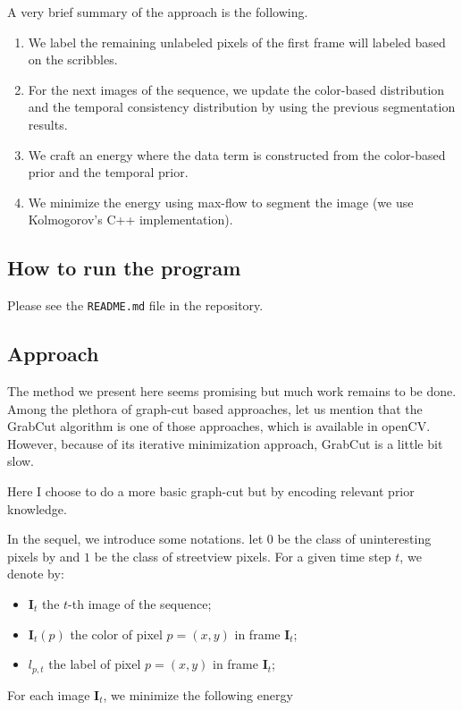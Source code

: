 \documentclass[a4paper,twoside,10pt]{article}
\begin{document}
A very brief summary of the approach is the following.
\begin{enumerate}
\item We label the remaining unlabeled pixels of the first frame will labeled based on the scribbles.
\item For the next images of the sequence, we update the color-based distribution and the temporal consistency distribution by using the previous segmentation results.
\item We craft an energy where the data term is constructed from the color-based prior and the temporal prior.
\item We minimize the energy using max-flow to segment the image (we use Kolmogorov's C++ implementation).
\end{enumerate}

\subsection{How to run the program}
Please see the \texttt{README.md} file in the repository.


\subsection{Approach}

The method we present here seems promising but much work remains to be done. Among the plethora of graph-cut based approaches, let us mention that the GrabCut algorithm is one of those approaches, which is available in openCV. However, because of its iterative minimization approach, GrabCut is a little bit slow.

Here I choose to do a more basic graph-cut but by encoding relevant prior knowledge.

In the sequel, we introduce some notations. let $0$ be the class of uninteresting pixels by and $1$ be the class of streetview pixels. For a given time step $t$, we denote by:
\begin{itemize}
\item $\mathbf{I}_t$ the $t$-th image of the sequence;
\item $\mathbf{I}_t(p)$ the color of pixel $p=(x,y)$ in frame $\mathbf{I}_t$;
\item $l_{p,t}$ the label of pixel $p=(x,y)$ in frame $\mathbf{I}_t$;
\end{itemize}

For each image $\mathbf{I}_t$, we minimize the following energy
\end{document}
